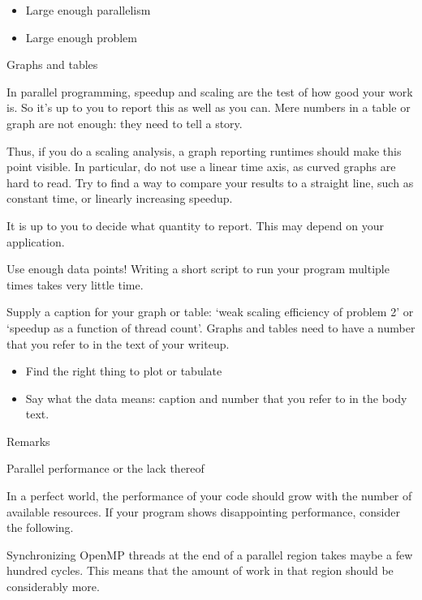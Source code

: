 \begin{tldr}
  \begin{itemize}
  \item Large enough parallelism
  \item Large enough problem
  \end{itemize}
\end{tldr}

 {Graphs and tables}

In parallel programming, speedup and scaling are the test of
how good your work is.
So it's up to you to report this as well as you can.
Mere numbers in a table or graph are not enough:
they need to tell a story.

Thus, if you do a scaling analysis,
a graph reporting runtimes should make this point visible.
In particular, do not use a linear time axis, as
curved graphs are hard to read. 
Try to find a way
to compare your results to a straight line, such as constant time, or
linearly increasing speedup.

It is up to you to decide what quantity to report.
This may depend on your application.

Use enough data points! Writing a short script to run
your program multiple times takes very little time.

Supply a caption for your graph or table: `weak scaling efficiency of problem 2'
or `speedup as a function of thread count'.
Graphs and tables need to have a number that you refer to in the text
of your writeup.

\begin{tldr}
  \begin{itemize}
  \item
    Find the right thing to plot or tabulate
  \item Say what the data means: caption and number that you
    refer to in the body text.
  \end{itemize}
\end{tldr}

 {Remarks}

 {Parallel performance or the lack thereof}

In a perfect world, the performance of your code should grow
with the number of available resources.
If your program shows disappointing performance,
consider the following.

Synchronizing OpenMP threads at the end of a parallel region takes
maybe a few hundred cycles. This means that the amount of work
in that region should be considerably more.

